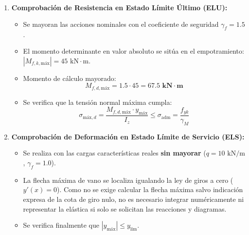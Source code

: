 {    \begin{enumerate}
        \item \textbf{Comprobación de Resistencia en Estado Límite Último (ELU):}
              \begin{itemize}
                  \item Se mayoran las acciones nominales con el coeficiente de seguridad $\gamma_f = 1.5$.
                  \item El momento determinante en valor absoluto se sitúa en el empotramiento: $|M_{f,k,\text{máx}}| = 45\text{ kN}\cdot\text{m}$.
                  \item Momento de cálculo mayorado:
                        \begin{equation}
                            M_{f,d,\text{máx}} = 1.5 \cdot 45 = \mathbf{67.5\text{ kN}\cdot\text{m}}
                        \end{equation}
                  \item Se verifica que la tensión normal máxima cumpla:
                        \begin{equation}
                            \sigma_{\text{máx},d} = \frac{M_{f,d,\text{máx}} \cdot y_{\text{máx}}}{I_z} \le \sigma_{\text{adm}} = \frac{f_{yk}}{\gamma_M}
                        \end{equation}
              \end{itemize}
        \item \textbf{Comprobación de Deformación en Estado Límite de Servicio (ELS):}
              \begin{itemize}
                  \item Se realiza con las cargas características reales \textbf{sin mayorar} ($q = 10\text{ kN/m}$, $\gamma_f = 1.0$).
                  \item La flecha máxima de vano se localiza igualando la ley de giros a cero ($y'(x) = 0$). Como no se exige calcular la flecha máxima salvo indicación expresa de la cota de giro nulo, no es necesario integrar numéricamente ni representar la elástica si solo se solicitan las reacciones y diagramas.
                  \item Se verifica finalmente que $|y_{\text{máx}}| \le y_{\text{lím}}$.
              \end{itemize}
    \end{enumerate}
}

